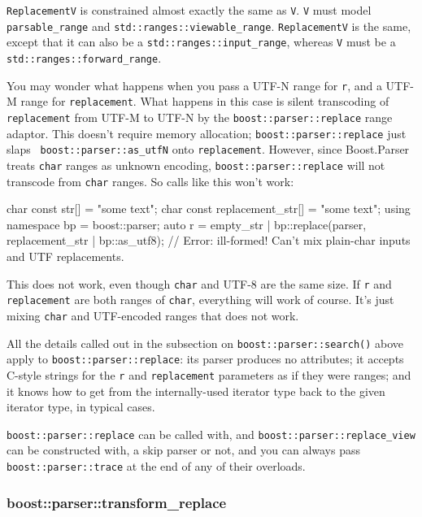 \texttt{ReplacementV} is constrained almost exactly the same as \texttt{V}. \texttt{V} must model \texttt{parsable\_range} and \texttt{std::ranges::viewable\_range}. \texttt{ReplacementV} is the same, except that it can also be a \texttt{std::ranges::input\_range}, whereas \texttt{V} must be a \texttt{std::ranges::forward\_range}.

You may wonder what happens when you pass a UTF-N range for \texttt{r}, and a UTF-M range for \texttt{replacement}. What happens in this case is silent transcoding of \texttt{replacement} from UTF-M to UTF-N by the \texttt{boost::parser::replace} range adaptor. This doesn't require memory allocation; \texttt{boost::parser::replace} just slaps \texttt{\textbar{} boost::parser::as\_utfN} onto \texttt{replacement}. However, since Boost.Parser treats \texttt{char} ranges as unknown encoding, \texttt{boost::parser::replace} will not transcode from \texttt{char} ranges. So calls like this won't work:

\begin{code}
char const str[] = "some text";
char const replacement_str[] = "some text";
using namespace bp = boost::parser;
auto r = empty_str | bp::replace(parser, replacement_str | bp::as_utf8); // Error: ill-formed!  Can't mix plain-char inputs and UTF replacements.
\end{code}

This does not work, even though \texttt{char} and UTF-8 are the same size. If \texttt{r} and \texttt{replacement} are both ranges of \texttt{char}, everything will work of course. It's just mixing \texttt{char} and UTF-encoded ranges that does not work.

All the details called out in the subsection on \texttt{boost::parser::search()} above apply to \texttt{boost::parser::replace}: its parser produces no attributes; it accepts C-style strings for the \texttt{r} and \texttt{replacement} parameters as if they were ranges; and it knows how to get from the internally-used iterator type back to the given iterator type, in typical cases.

\texttt{boost::parser::replace} can be called with, and \texttt{boost::parser::replace\_view} can be constructed with, a skip parser or not, and you can always pass \texttt{boost::parser::trace} at the end of any of their overloads.

\subsubsection{boost::parser::transform\_replace}

